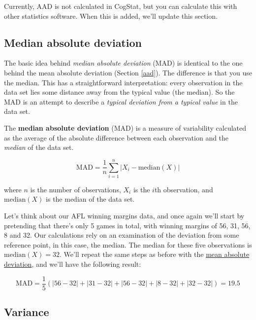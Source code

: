 \documentclass[
  11pt,
  a4paper,
  twoside,symmetric,openright]{book}
\theoremstyle{break}
\theoremstyle{break}
\begin{document}
Currently, AAD is not calculated in CogStat, but you can calculate this with other statistics software. When this is added, we'll update this section.

\hypertarget{mad}{%
\subsection{Median absolute deviation}\label{mad}}

The basic idea behind \emph{median absolute deviation} (MAD) is identical to the one behind the mean absolute deviation (Section \ref{aad}). The difference is that you use the median. This has a straightforward interpretation: every observation in the data set lies some distance away from the typical value (the median). So the MAD is an attempt to describe a \emph{typical deviation from a typical value} in the data set.

\begin{definition}
\protect\hypertarget{def:defMAD}{}\label{def:defMAD}The \textbf{median absolute deviation} (MAD) is a measure of variability calculated as the average of the absolute difference between each observation and the \emph{median} of the data set.

\[
\text{MAD} = \frac{1}{n} \sum_{i=1}^n |X_i - \text{median}(X)|
\]

where \(n\) is the number of observations, \(X_i\) is the \(i\)th observation, and \(\text{median}(X)\) is the median of the data set.
\end{definition}

\begin{example}
\protect\hypertarget{exm:exMAD}{}\label{exm:exMAD}Let's think about our AFL winning margins data, and once again we'll start by pretending that there's only 5 games in total, with winning margins of 56, 31, 56, 8 and 32. Our calculations rely on an examination of the deviation from some reference point, in this case, the median. The median for these five observations is \(\text{median}(X) = 32\). We'll repeat the same steps as before with the \protect\hyperlink{exAAD}{mean absolute deviation}, and we'll have the following result:

\[
\text{MAD} = \frac{1}{5} \left( |56 - 32| + |31 - 32| + |56 - 32| + |8 - 32| + |32 - 32| \right) = 19.5
\]
\end{example}

\hypertarget{variance}{%
\subsection{Variance}\label{variance}}
\end{document}
